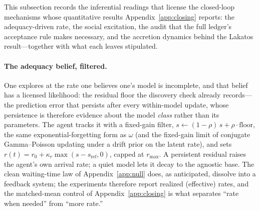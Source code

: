 This subsection records the inferential readings that license the closed-loop mechanisms whose
quantitative results Appendix~\ref{app:closing} reports: the adequacy-driven rate, the social
excitation, the audit that the full ledger's acceptance rule makes necessary, and the accretion
dynamics behind the Lakatos result---together with what each leaves stipulated.

\paragraph{The adequacy belief, filtered.}
One explores at the rate one believes one's model is incomplete, and that belief has a licensed
likelihood: the residual floor the discovery check already records---the prediction error that
persists after every within-model update, whose persistence is therefore evidence about the
model \emph{class} rather than its parameters. The agent tracks it with a fixed-gain filter,
$s \leftarrow (1-\rho)\,s + \rho\cdot\mathrm{floor}$, the same exponential-forgetting form as
$\omega$ (and the fixed-gain limit of conjugate Gamma--Poisson updating under a drift prior on
the latent rate), and sets $r(t) = r_0 + \kappa_r \max(s - s_{\mathrm{ref}}, 0)$, capped at
$r_{\max}$. A persistent residual raises the agent's own arrival rate; a quiet model lets it
decay to the agnostic base. The clean waiting-time law of Appendix~\ref{app:null} does, as
anticipated, dissolve into a feedback system; the experiments therefore report realized
(effective) rates, and the matched-mean control of Appendix~\ref{app:closing} is what separates
``rate when needed'' from ``more rate.''

